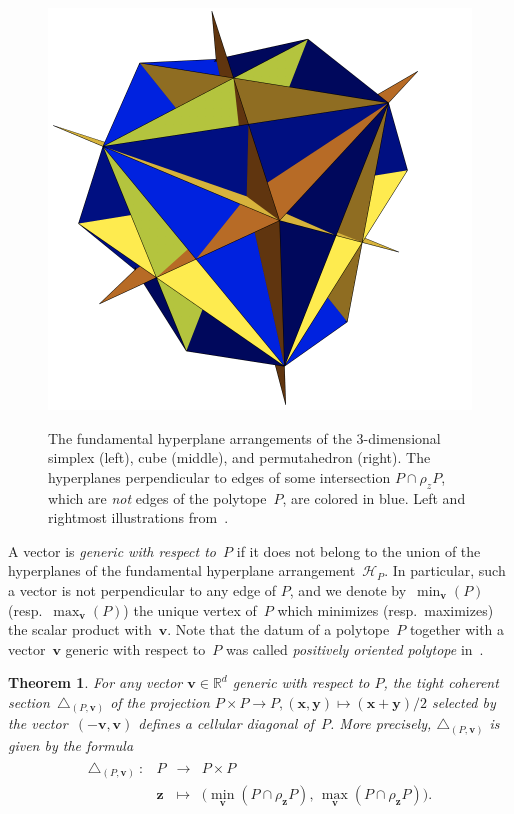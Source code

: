\documentclass{amsart}
\newcommand{\darkblue}{\color{darkblue}} %
\newtheorem{theorem}{Theorem}[section]
\theoremstyle{definition}
\newcommand{\R}{\mathbb{R}} %
\renewcommand{\b}[1]{{\boldsymbol{#1}}} %
\newcommand{\resp}{resp.~} %
\newcommand{\defn}[1]{\textsl{\darkblue #1}} %
\renewcommand{\b}[1]{\boldsymbol{#1}} %
\begin{document}
\begin{figure}[p]
{		\includegraphics[scale=.38]{HypPermuto.png}
	}
	\caption{The fundamental hyperplane arrangements of the $3$-dimensional simplex (left), cube (middle), and permutahedron (right). The hyperplanes perpendicular 
	to edges of some intersection $P\cap \rho_z P$, which are \emph{not} edges of the polytope~$P$, are colored in blue. Left and rightmost illustrations from~\cite[Fig.~12]{LaplanteAnfossi}.}
	\label{fig:examplesHyperplanes}
\end{figure}

A vector is \defn{generic with respect to~$P$} if it does not belong to the union of the hyperplanes of the fundamental hyperplane arrangement~$\mathcal{H}_P$.
In particular, such a vector is not perpendicular to any edge of $P$, and we denote by~$\min_{\b{v}}(P)$ (\resp $\max_{\b{v}}(P)$) the unique vertex of~$P$ which minimizes (\resp maximizes) the scalar product with~$\b{v}$. 
Note that the datum of a polytope~$P$ together with a vector~$\b{v}$ generic with respect to~$P$ was called \defn{positively oriented polytope} in~\cite{MasudaThomasTonksVallette,LaplanteAnfossi,LaplanteAnfossiMazuir}.

\pagebreak

\begin{theorem}
\label{thm:diagonal}
For any vector $\b{v} \in \R^d$ generic with respect to $P$, the tight coherent section~$\triangle_{(P,\b{v})}$ of the projection $P \times P \to P, (\b{x}, \b{y}) \mapsto (\b{x}+\b{y})/2$ selected by the vector~$(-\b{v}, \b{v})$ defines a cellular diagonal of~$P$.
More precisely, $\triangle_{(P,\b{v})}$ is given by the formula
\begin{align*}
	\begin{array}{rlcl}
		\triangle_{(P,\b{v})}\ : & P & \to & P\times P \\
		& \b{z} & \mapsto & \bigl( \min_{\b{v}}(P\cap \rho_{\b{z}} P), \, \max_{\b{v}}(P\cap \rho_{\b{z}} P) \bigr) .
	\end{array}
\end{align*}
\end{theorem}
\end{document}
